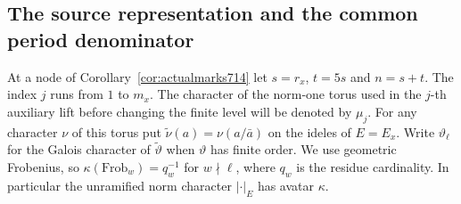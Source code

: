 \documentclass[a4paper,11pt]{article}
\theoremstyle{definition}
\theoremstyle{remark}
\numberwithin{equation}{section}
\begin{document}
\subsection{The source representation and the common period denominator}
\label{sec:sourceperiod803}
At a node of Corollary~\ref{cor:actualmarks714} let \(s=r_x\),
\(t=5s\) and \(n=s+t\). The index \(j\) runs from \(1\) to \(m_x\).
The character of the norm-one torus used in the \(j\)-th auxiliary
lift before changing the finite level will be denoted by \(\mu_j\).
For any character \(\nu\) of this torus put
\(\widetilde\nu(a)=\nu(a/\bar a)\) on the ideles of \(E=E_x\).
Write \(\vartheta_\ell\) for the Galois character of
\(\widetilde\vartheta\) when \(\vartheta\) has finite order. We use
geometric Frobenius, so \(\kappa(\mathrm{Frob}_w)=q_w^{-1}\) for
\(w\nmid\ell\), where \(q_w\) is the residue cardinality. In
particular the unramified norm character \(|\cdot|_E\) has avatar
\(\kappa\).
\end{document}
